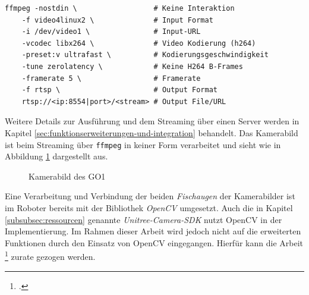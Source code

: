 \begin{lstlisting}
ffmpeg -nostdin \                  # Keine Interaktion
    -f video4linux2 \              # Input Format
    -i /dev/video1 \               # Input-URL
    -vcodec libx264 \              # Video Kodierung (h264)
    -preset:v ultrafast \          # Kodierungsgeschwindigkeit
    -tune zerolatency \            # Keine H264 B-Frames
    -framerate 5 \                 # Framerate
    -f rtsp \                      # Output Format
    rtsp://<ip:8554|port>/<stream> # Output File/URL
\end{lstlisting}

\noindent Weitere Details zur Ausführung und dem Streaming über einen Server werden in Kapitel \ref{sec:funktionserweiterungen-und-integration}
behandelt.
Das Kamerabild ist beim Streaming über \texttt{ffmpeg} in keiner Form verarbeitet und sieht wie in Abbildung \ref{fig:kamera-bild}
dargestellt aus.

\begin{figure}[h]
    \caption{Kamerabild des GO1}\label{fig:kamera-bild}
\end{figure}

Eine Verarbeitung und Verbindung der beiden \emph{Fischaugen} der Kamerabilder ist im Roboter bereits mit der Bibliothek \emph{OpenCV}
umgesetzt.
Auch die in Kapitel \ref{subsubsec:ressourcen} genannte \emph{Unitree-Camera-SDK} nutzt OpenCV in der Implementierung.
Im Rahmen dieser Arbeit wird jedoch nicht auf die erweiterten Funktionen durch den Einsatz von OpenCV eingegangen.
Hierfür kann die Arbeit \footcite{jonas} zurate gezogen werden.